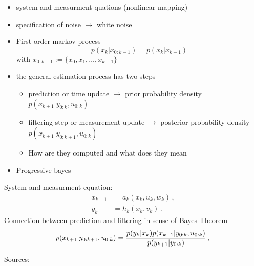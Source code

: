 \documentclass[a4paper]{IEEEtran}
\begin{document}
\begin{itemize}
    \item system and measurment quations (nonlinear mapping)
    \item specification of noise $\rightarrow$ white noise 
    \item First order markov process $$p(x_{k} \vert x_{0:k-1}) = p(x_{k} \vert x_{k-1})$$
    with $x_{0:k-1} := \{x_{0}, x_{1}, \dots, x_{k-1}\}$ 
    \item the general estimation process has two steps
    \begin{itemize}
        \item prediction or time update $\rightarrow$ prior probability density $p(x_{k+1} \vert y_{0:k}, u_{0:k})$
        \item filtering step or measurement update $\rightarrow$ posterior probability density $p(x_{k+1} \vert y_{0:k+1}, u_{0:k})$
        \item How are they computed and what does they mean
    \end{itemize}
    \item Progressive bayes
\end{itemize}
System and measurment equation:
\begin{equation}
    \begin{split}
        x_{k+1}  &= a_{k}(x_{k}, u_{k}, w_{k}) \,, \\
        y_{k}    &= h_{k}(x_{k}, v_{k}) \,.
    \end{split}
\end{equation}
Connection between prediction and filtering in sense of Bayes Theorem
\begin{equation}
    p(x_{k+1} \vert y_{0:k+1}, u_{0:k}) =  \frac{p(y_{k} \vert x_{k})p(x_{k+1} \vert y_{0:k}, u_{0:k})}{p(y_{k+1} \vert y_{0:k})}\,, \\
\end{equation}

Sources:
\cite{chen2003}


\end{document}
